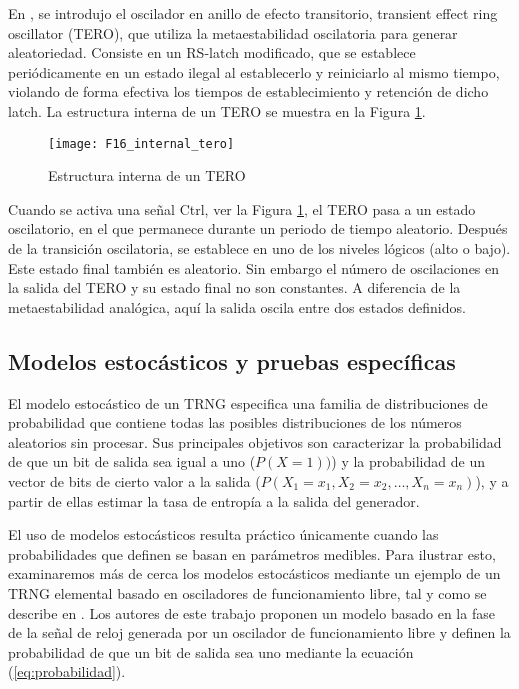                 En \cite{Varchola2010}, se introdujo el oscilador en anillo de efecto transitorio, transient effect ring oscillator (TERO), que utiliza la metaestabilidad oscilatoria para generar aleatoriedad. Consiste en un RS-latch modificado, que se establece periódicamente en un estado ilegal al establecerlo y reiniciarlo al mismo tiempo, violando de forma efectiva los tiempos de establecimiento y retención de dicho latch. La estructura interna de un TERO se muestra en la Figura \ref{fig:F16_internal_tero}.

                \begin{figure}[hbtp]
                    \centering
                    \texttt{[image: F16\_internal\_tero]}
                    \caption{Estructura interna de un TERO}
                    \label{fig:F16_internal_tero}
                \end{figure}

                Cuando se activa una señal Ctrl, ver la Figura \ref{fig:F16_internal_tero}, el TERO pasa a un estado oscilatorio, en el que permanece durante un periodo de tiempo aleatorio. Después de la transición oscilatoria, se establece en uno de los niveles lógicos (alto o bajo). Este estado final también es aleatorio. Sin embargo el número de oscilaciones en la salida del TERO y su estado final no son constantes. A diferencia de la metaestabilidad analógica, aquí la salida oscila entre dos estados definidos.

        \subsection{Modelos estocásticos y pruebas específicas}

            El modelo estocástico de un TRNG especifica una familia de distribuciones de probabilidad que contiene todas las posibles distribuciones de los números aleatorios sin procesar. Sus principales objetivos son caracterizar la probabilidad de que un bit de salida sea igual a uno ($P(X = 1))$) y la probabilidad de un vector de bits de cierto valor a la salida ($P(X_1 = x_1, X_2 = x_2, \ldots, X_n = x_n)$), y a partir de ellas estimar la tasa de entropía a la salida del generador.

            El uso de modelos estocásticos resulta práctico únicamente cuando las probabilidades que definen se basan en parámetros medibles. Para ilustrar esto, examinaremos más de cerca los modelos estocásticos mediante un ejemplo de un TRNG elemental basado en osciladores de funcionamiento libre, tal y como se describe en \cite{Baudet2010}. Los autores de este trabajo proponen un modelo basado en la fase de la señal de reloj generada por un oscilador de funcionamiento libre y definen la probabilidad de que un bit de salida sea uno mediante la ecuación (\ref{eq:probabilidad}).

